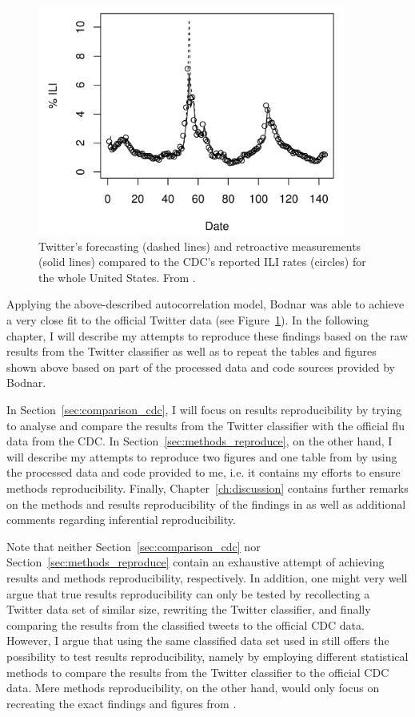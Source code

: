 \documentclass[11pt, a4paper,twoside]{report}\usepackage[]{graphicx}\usepackage[]{color}
\begin{document}
\begin{figure}[H]
  \centering
    \includegraphics[width=0.9\textwidth,height=0.6\textwidth]{03_cdc_fit_bodnar_thesis.png}
  \caption{Twitter's forecasting (dashed lines) and retroactive measurements (solid lines) compared to the CDC's reported ILI rates (circles) for the whole United States. From \cite{bodnar_data_2015}.}
  \label{fig:cdc_fit_bodnar_thesis}
  \end{figure}
  
Applying the above-described autocorrelation model, Bodnar was able to achieve a very close fit to the official Twitter data (see Figure~\ref{fig:cdc_fit_bodnar_thesis}). In the following chapter, I will describe my attempts to reproduce these findings based on the raw results from the Twitter classifier as well as to repeat the tables and figures shown above based on part of the processed data and code sources provided by Bodnar. 

In Section~\ref{sec:comparison_cdc}, I will focus on results reproducibility by trying to analyse and compare the results from the Twitter classifier with the official flu data from the CDC. In Section~\ref{sec:methods_reproduce}, on the other hand, I will describe my attempts to reproduce two figures and one table from \cite{bodnar_data_2015} by using the processed data and code provided to me, i.e. it contains my efforts to ensure methods reproducibility. Finally, Chapter~\ref{ch:discussion} contains further remarks on the methods and results reproducibility of the findings in \cite{bodnar_data_2015} as well as additional comments regarding inferential reproducibility.

Note that neither Section~\ref{sec:comparison_cdc} nor Section~\ref{sec:methods_reproduce} contain an exhaustive attempt of achieving results and methods reproducibility, respectively. In addition, one might very well argue that true results reproducibility can only be tested by recollecting a Twitter data set of similar size, rewriting the Twitter classifier, and finally comparing the results from the classified tweets to the official CDC data. However, I argue that using the same classified data set used in \cite{bodnar_data_2015} still offers the possibility to test results reproducibility, namely by employing different statistical methods to compare the results from the Twitter classifier to the official CDC data. Mere methods reproducibility, on the other hand, would only focus on recreating the exact findings and figures from \cite{bodnar_data_2015}.
\end{document}
